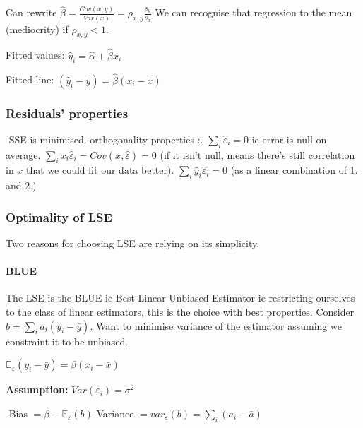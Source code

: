 \documentclass[
]{article}
\begin{document}
Can rewrite
\(\hat{\beta}=\frac{Cov(x,y)}{Var(x)}=\rho_{x,y}\frac{s_y}{s_x}\) We can
recognise that regression to the mean (mediocrity) if \(\rho_{x,y}<1\).

Fitted values: \(\hat{y}_i=\hat{\alpha}+\hat{\beta}x_i\)

Fitted line: \((\hat{y}_i-\bar{y})=\hat{\beta}(x_i-\bar{x})\)

\hypertarget{residuals-properties}{%
\subsubsection{Residuals' properties}\label{residuals-properties}}

-SSE is minimised.\newline -orthogonality properties :. \(\sum_i\hat{\varepsilon}_i=0\) ie error is null on average. \(\sum_i x_i\hat{\varepsilon}_i=Cov(x,\hat{\varepsilon})=0\) (if it
isn't null, means there's still correlation in \(x\) that we could fit
our data better). \(\sum_i\hat{y}_i\hat{\varepsilon}_i=0\) (as a linear combination of
1. and 2.)

\hypertarget{optimality-of-lse}{%
\subsubsection{Optimality of LSE}\label{optimality-of-lse}}

Two reasons for choosing LSE are relying on its simplicity.

\hypertarget{blue}{%
\paragraph{BLUE}\label{blue}}

The LSE is the BLUE ie Best Linear Unbiased Estimator ie restricting
ourselves to the class of linear estimators, this is the choice with
best properties. Consider \(b=\sum_i a_i(y_i-\bar{y})\). Want to
minimise variance of the estimator assuming we constraint it to be
unbiased.

\(\mathbb{E}_{\varepsilon}(y_i-\bar{y})=\beta (x_i-\bar{x})\)

\textbf{Assumption:} \(Var(\varepsilon_i)=\sigma^2\)\newline

-Bias \(=\beta-\mathbb{E}_{\varepsilon}(b)\)\newline  -Variance
\(=var_\varepsilon(b)=\sum_i (a_i-\bar{a})\)\newline 
\end{document}
